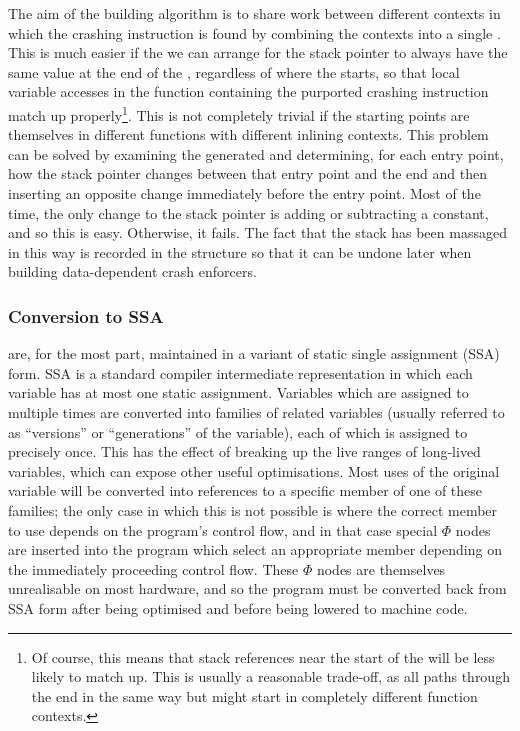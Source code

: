 The aim of the {\StateMachine} building algorithm is to share work
between different contexts in which the crashing instruction is found
by combining the contexts into a single {\StateMachine}.  This is much
easier if the we can arrange for the stack pointer to always have the
same value at the end of the {\StateMachine}, regardless of where the
{\StateMachine} starts, so that local variable accesses in the
function containing the purported crashing instruction match up
properly\footnote{Of course, this means that stack references near the
  start of the {\StateMachine} will be less likely to match up.  This
  is usually a reasonable trade-off, as all paths through the
  {\StateMachine} end in the same way but might start in completely
  different function contexts.}.  This is not completely trivial if
the starting points are themselves in different functions with
different inlining contexts.  This problem can be solved by examining
the generated {\StateMachine} and determining, for each entry point,
how the stack pointer changes between that entry point and the end and
then inserting an opposite change immediately before the entry point.
Most of the time, the only change to the stack pointer is adding or
subtracting a constant, and so this is easy.  Otherwise, it fails.
The fact that the stack has been massaged in this way is recorded in
the {\StateMachine} structure so that it can be undone later when
building data-dependent crash enforcers.


\subsubsection{Conversion to SSA}
\label{sect:ssa}

{\STateMachines} are, for the most part, maintained in a variant of
static single assignment (SSA) form.  SSA is a standard compiler
intermediate representation in which each variable has at most one
static assignment\needCite{}.  Variables which are assigned to
multiple times are converted into families of related variables
(usually referred to as ``versions'' or ``generations'' of the
variable), each of which is assigned to precisely once.  This has the
effect of breaking up the live ranges of long-lived variables, which
can expose other useful optimisations.  Most uses of the original
variable will be converted into references to a specific member of one
of these families; the only case in which this is not possible is
where the correct member to use depends on the program's control flow,
and in that case special $\Phi$ nodes are inserted into the program
which select an appropriate member depending on the immediately
proceeding control flow.  These $\Phi$ nodes are themselves
unrealisable on most hardware, and so the program must be converted
back from SSA form after being optimised and before being lowered to
machine code.

